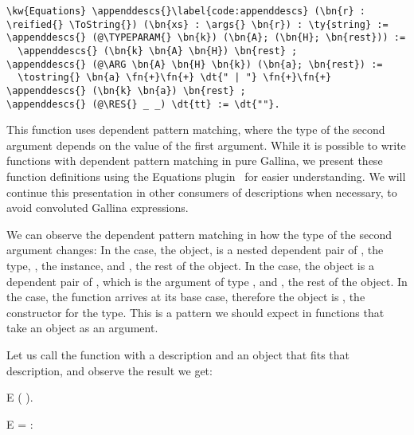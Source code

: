 \begin{Verbatim}
\kw{Equations} \appenddescs{}\label{code:appenddescs} (\bn{r} : \reified{} \ToString{}) (\bn{xs} : \args{} \bn{r}) : \ty{string} :=
\appenddescs{} (@\TYPEPARAM{} \bn{k}) (\bn{A}; (\bn{H}; \bn{rest})) :=
  \appenddescs{} (\bn{k} \bn{A} \bn{H}) \bn{rest} ;
\appenddescs{} (@\ARG \bn{A} \bn{H} \bn{k}) (\bn{a}; \bn{rest}) := 
  \tostring{} \bn{a} \fn{+}\fn{+} \dt{" | "} \fn{+}\fn{+} \appenddescs{} (\bn{k} \bn{a}) \bn{rest} ;
\appenddescs{} (@\RES{} _ _) \dt{tt} := \dt{""}.
\end{Verbatim}

This function uses dependent pattern matching, where the type of the second argument depends on the value of the first argument.
While it is possible to write functions with dependent pattern matching in pure \gls{Gallina}, we present these function definitions using the Equations plugin~\cite{sozeau2019equations} for easier understanding. We will continue this presentation in other consumers of \reified{} descriptions when necessary, to avoid convoluted \gls{Gallina} expressions.

We can observe the dependent pattern matching in how the type of the second argument changes: In the \TYPEPARAM{} case, the \args{} object, is a nested dependent pair of , the type, , the \ToString{} instance, and , the rest of the \args{} object.
In the \ARG{} case, the \args{} object is a dependent pair of , which is the argument of type , and , the rest of the \args{} object.
In the \RES{} case, the \args{} function arrives at its base case, therefore the \args{} object is , the constructor for the  type.
This is a pattern we should expect in functions that take an \args{} object as an argument.

Let us call the \appenddescs{} function with a \reified{} description and an \args{} object that fits that description, and observe the result we get:

\vspace{.2in}
\begin{SaveVerbatim}{E}
 (\appenddescs{} \lengthdesc{} \lengthargs{}).
\end{SaveVerbatim}

\begin{SaveVerbatim}{E}
  = 
  : 
\end{SaveVerbatim}


\newcommand{\result}{\hyperref[code:result]{\fn{result}}}

